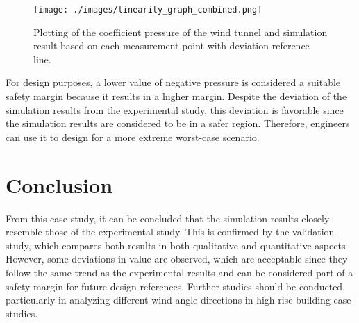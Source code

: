 \documentclass[12pt,a4paper]{cibb}
\begin{document}
\begin{figure}[h]
\vspace{1mm}
 \begin{center}
\texttt{[image: ./images/linearity\_graph\_combined.png]}
\caption{
Plotting of the coefficient pressure of the wind tunnel and simulation result based on each measurement point with deviation reference line.}
\label{fig:linearlines}
\vspace{-5mm}
\end{center}
\end{figure}

For design purposes, a lower value of negative pressure is considered a suitable safety margin because it results in a higher margin. Despite the deviation of the simulation results from the experimental study, this deviation is favorable since the simulation results are considered to be in a safer region. Therefore, engineers can use it to design for a more extreme worst-case scenario.

\section{\bf Conclusion}
\label{sec:CONCLUSIONS}

From this case study, it can be concluded that the simulation results closely resemble those of the experimental study. This is confirmed by the validation study, which compares both results in both qualitative and quantitative aspects. However, some deviations in value are observed, which are acceptable since they follow the same trend as the experimental results and can be considered part of a safety margin for future design references. Further studies should be conducted, particularly in analyzing different wind-angle directions in high-rise building case studies.

\footnotesize

 
\normalsize
\end{document}
